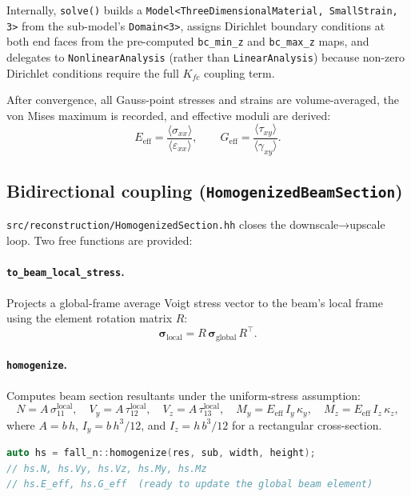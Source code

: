 Internally, \texttt{solve()} builds a \texttt{Model<ThreeDimensionalMaterial,
SmallStrain, 3>} from the sub-model's \texttt{Domain<3>}, assigns
Dirichlet boundary conditions at both end faces from the pre-computed
\texttt{bc\_min\_z} and \texttt{bc\_max\_z} maps, and delegates to
\texttt{NonlinearAnalysis} (rather than \texttt{LinearAnalysis}) because
non-zero Dirichlet conditions require the full $K_{fc}$ coupling term.

After convergence, all Gauss-point stresses and strains are volume-averaged,
the von Mises maximum is recorded, and effective moduli are derived:
\[
  E_\text{eff} = \frac{\langle \sigma_{xx} \rangle}{\langle \varepsilon_{xx} \rangle},
  \qquad
  G_\text{eff} = \frac{\langle \tau_{xy} \rangle}{\langle \gamma_{xy} \rangle}.
\]

\subsection{Bidirectional coupling (\texttt{HomogenizedBeamSection})}

\texttt{src/reconstruction/HomogenizedSection.hh} closes the downscale→upscale
loop.  Two free functions are provided:

\paragraph{\texttt{to\_beam\_local\_stress}.}
Projects a global-frame average Voigt stress vector to the beam's local frame
using the element rotation matrix $R$:
\[
  \boldsymbol{\sigma}_\text{local} = R\,\boldsymbol{\sigma}_\text{global}\,R^\top.
\]

\paragraph{\texttt{homogenize}.}
Computes beam section resultants under the uniform-stress assumption:
\[
  N = A\,\sigma_{11}^\text{local},\quad
  V_y = A\,\tau_{12}^\text{local},\quad
  V_z = A\,\tau_{13}^\text{local},\quad
  M_y = E_\text{eff}\,I_y\,\kappa_y,\quad
  M_z = E_\text{eff}\,I_z\,\kappa_z,
\]
where $A = b\,h$, $I_y = b\,h^3/12$, and $I_z = h\,b^3/12$ for a
rectangular cross-section.

\begin{lstlisting}[language=C++,caption={Bidirectional coupling},
                   label={lst:homogenize}]
auto hs = fall_n::homogenize(res, sub, width, height);
// hs.N, hs.Vy, hs.Vz, hs.My, hs.Mz
// hs.E_eff, hs.G_eff  (ready to update the global beam element)
\end{lstlisting}

